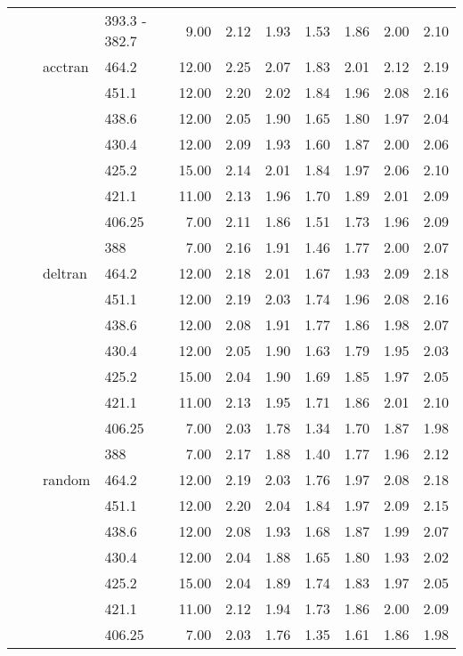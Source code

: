 \begin{longtable}{llllrrrrrrr}
   &  &  & 393.3 - 382.7 & 9.00 & 2.12 & 1.93 & 1.53 & 1.86 & 2.00 & 2.10 \\ 
   &  & acctran & 464.2 & 12.00 & 2.25 & 2.07 & 1.83 & 2.01 & 2.12 & 2.19 \\ 
   &  &  & 451.1 & 12.00 & 2.20 & 2.02 & 1.84 & 1.96 & 2.08 & 2.16 \\ 
   &  &  & 438.6 & 12.00 & 2.05 & 1.90 & 1.65 & 1.80 & 1.97 & 2.04 \\ 
   &  &  & 430.4 & 12.00 & 2.09 & 1.93 & 1.60 & 1.87 & 2.00 & 2.06 \\ 
   &  &  & 425.2 & 15.00 & 2.14 & 2.01 & 1.84 & 1.97 & 2.06 & 2.10 \\ 
   &  &  & 421.1 & 11.00 & 2.13 & 1.96 & 1.70 & 1.89 & 2.01 & 2.09 \\ 
   &  &  & 406.25 & 7.00 & 2.11 & 1.86 & 1.51 & 1.73 & 1.96 & 2.09 \\ 
   &  &  & 388 & 7.00 & 2.16 & 1.91 & 1.46 & 1.77 & 2.00 & 2.07 \\ 
   &  & deltran & 464.2 & 12.00 & 2.18 & 2.01 & 1.67 & 1.93 & 2.09 & 2.18 \\ 
   &  &  & 451.1 & 12.00 & 2.19 & 2.03 & 1.74 & 1.96 & 2.08 & 2.16 \\ 
   &  &  & 438.6 & 12.00 & 2.08 & 1.91 & 1.77 & 1.86 & 1.98 & 2.07 \\ 
   &  &  & 430.4 & 12.00 & 2.05 & 1.90 & 1.63 & 1.79 & 1.95 & 2.03 \\ 
   &  &  & 425.2 & 15.00 & 2.04 & 1.90 & 1.69 & 1.85 & 1.97 & 2.05 \\ 
   &  &  & 421.1 & 11.00 & 2.13 & 1.95 & 1.71 & 1.86 & 2.01 & 2.10 \\ 
   &  &  & 406.25 & 7.00 & 2.03 & 1.78 & 1.34 & 1.70 & 1.87 & 1.98 \\ 
   &  &  & 388 & 7.00 & 2.17 & 1.88 & 1.40 & 1.77 & 1.96 & 2.12 \\ 
   &  & random & 464.2 & 12.00 & 2.19 & 2.03 & 1.76 & 1.97 & 2.08 & 2.18 \\ 
   &  &  & 451.1 & 12.00 & 2.20 & 2.04 & 1.84 & 1.97 & 2.09 & 2.15 \\ 
   &  &  & 438.6 & 12.00 & 2.08 & 1.93 & 1.68 & 1.87 & 1.99 & 2.07 \\ 
   &  &  & 430.4 & 12.00 & 2.04 & 1.88 & 1.65 & 1.80 & 1.93 & 2.02 \\ 
   &  &  & 425.2 & 15.00 & 2.04 & 1.89 & 1.74 & 1.83 & 1.97 & 2.05 \\ 
   &  &  & 421.1 & 11.00 & 2.12 & 1.94 & 1.73 & 1.86 & 2.00 & 2.09 \\ 
   &  &  & 406.25 & 7.00 & 2.03 & 1.76 & 1.35 & 1.61 & 1.86 & 1.98 \\ 

\end{longtable}
